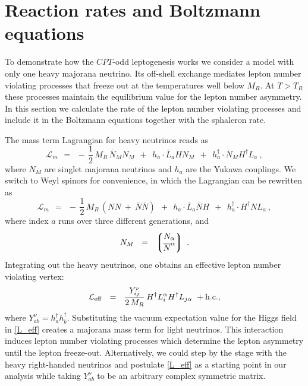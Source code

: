\documentclass[12pt]{revtex4}
\newcommand{\ov}{\overline}
\begin{document}
%
%
\section{Reaction rates and Boltzmann equations}
\label{rates}

	To demonstrate how the $CPT$-odd leptogenesis works we consider a model with only one heavy 
majorana neutrino. Its off-shell exchange mediates lepton number violating processes that 
	freeze out at the temperatures well below $ M_R $.
	At $ T > T_R $ these processes maintain the equilibrium value for the
	lepton number asymmetry. 
	In this section we calculate the rate of the lepton number violating processes and include it
	in the Boltzmann equations together with the sphaleron rate.
	
The mass term Lagrangian for heavy neutrinos reads as
\begin{equation}
	\mathcal{L}_m  ~~=~~ -\,\frac 12\, M_R\, \ov{N}{}_MN_M ~~+~~
				h_a\cdot \ov{L}_aHN_M ~~+~~  
				h_a^\dagger\cdot \ov{N}{}_MH^\dagger L_a~,
\end{equation}
	where $ N_M $ are singlet majorana neutrinos and $ h_a $ are the Yukawa couplings.
	We switch to Weyl spinors for convenience, in which the Lagrangian can be rewritten as
\begin{equation}
	\mathcal{L}_m  ~~=~~ 
	-\,\frac 12\, M_R\, \left( NN ~+~ \ov{N}\ov{N} \right) ~~+~~
				h_a\cdot \ov{L}_a\ov{ N}H ~~+~~  
				h_a^\dagger\cdot H^\dagger N L_a~,
\end{equation}
	where index $a$ runs over three different generations, and
\[	
	N_M ~~=~~ \left\lgroup 
		\begin{matrix}
			N_\alpha \\
			\ov{N}^{\dot{\alpha}}
		\end{matrix}
		\right\rgroup~.
\]
	Integrating out the heavy neutrinos, one obtains an effective lepton number violating vertex:
\begin{equation}
\label{L_eff}
	\mathcal{L}_{\rm eff} ~~=~~ \frac{Y_{ij}^\nu}{2\, M_R} \, H^\dag L_i^\alpha H^\dag L_{j\alpha}~
+{\rm h.c.},
\end{equation}
where $Y_{ab}^\nu=h_a^\dag h_b^\dag$.
	Substituting the vacuum expectation value 
for the Higgs field in \eqref{L_eff}
	creates a majorana mass term for light neutrinos. 
This interaction induces lepton number
violating processes which determine the lepton asymmetry
	until the lepton freeze-out. Alternatively, we could step by the stage with the heavy right-handed 
	neutrinos and postulate \eqref{L_eff} as a starting point in our analysis while taking $Y^\nu_{ab}$
	to be an arbitrary complex symmetric matrix. 
	
\end{document}
